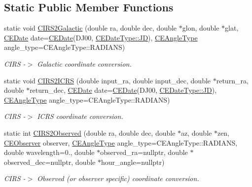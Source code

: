 \subsection*{Static Public Member Functions}
\begin{DoxyCompactItemize}
\item 
static void \hyperlink{class_c_e_coordinates_acc48a4431787fe52fe5c09d0dd088732}{C\+I\+R\+S2\+Galactic} (double ra, double dec, double $\ast$glon, double $\ast$glat, \hyperlink{class_c_e_date}{C\+E\+Date} date=\hyperlink{class_c_e_date}{C\+E\+Date}(D\+J00, \hyperlink{_c_e_date_8h_aa6b826beca26b0712061a4afc5ad7746aabf8d7515962e526421842e8456798cc}{C\+E\+Date\+Type\+::\+J\+D}), \hyperlink{namespace_cpp_ephem_a9a974f6ccf329e8cb5f9208b725f15ef}{C\+E\+Angle\+Type} angle\+\_\+type=C\+E\+Angle\+Type\+::\+R\+A\+D\+I\+A\+N\+S)
\begin{DoxyCompactList}\small\item\em C\+I\+R\+S -\/$>$ Galactic coordinate conversion. \end{DoxyCompactList}\item 
static void \hyperlink{class_c_e_coordinates_a8330914a9a58924993ddf3daf65a0ed0}{C\+I\+R\+S2\+I\+C\+R\+S} (double input\+\_\+ra, double input\+\_\+dec, double $\ast$return\+\_\+ra, double $\ast$return\+\_\+dec, \hyperlink{class_c_e_date}{C\+E\+Date} date=\hyperlink{class_c_e_date}{C\+E\+Date}(D\+J00, \hyperlink{_c_e_date_8h_aa6b826beca26b0712061a4afc5ad7746aabf8d7515962e526421842e8456798cc}{C\+E\+Date\+Type\+::\+J\+D}), \hyperlink{namespace_cpp_ephem_a9a974f6ccf329e8cb5f9208b725f15ef}{C\+E\+Angle\+Type} angle\+\_\+type=C\+E\+Angle\+Type\+::\+R\+A\+D\+I\+A\+N\+S)
\begin{DoxyCompactList}\small\item\em C\+I\+R\+S -\/$>$ I\+C\+R\+S coordinate conversion. \end{DoxyCompactList}\item 
static int \hyperlink{class_c_e_coordinates_a8b3cadaf04a15c5bb281b5aea675c7e9}{C\+I\+R\+S2\+Observed} (double ra, double dec, double $\ast$az, double $\ast$zen, \hyperlink{class_c_e_observer}{C\+E\+Observer} observer, \hyperlink{namespace_cpp_ephem_a9a974f6ccf329e8cb5f9208b725f15ef}{C\+E\+Angle\+Type} angle\+\_\+type=C\+E\+Angle\+Type\+::\+R\+A\+D\+I\+A\+N\+S, double wavelength=0., double $\ast$observed\+\_\+ra=nullptr, double $\ast$observed\+\_\+dec=nullptr, double $\ast$hour\+\_\+angle=nullptr)
\begin{DoxyCompactList}\small\item\em C\+I\+R\+S -\/$>$ Observed (or observer specific) coordinate conversion. \end{DoxyCompactList}\item 

\end{DoxyCompactItemize}

